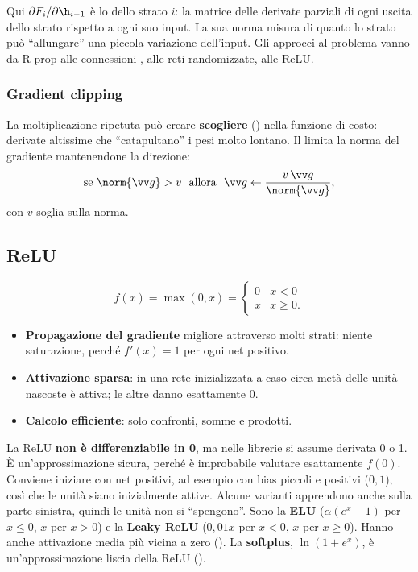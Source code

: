 Qui $\partial F_i/\partial\h_{i-1}$ è lo  dello strato $i$: la matrice delle derivate parziali di
ogni uscita dello strato rispetto a ogni suo input. La sua norma misura di quanto lo strato può ``allungare'' una
piccola variazione dell'input. Gli approcci al problema vanno da R-prop alle connessioni , alle reti
randomizzate, alle ReLU.

\subsubsection{Gradient clipping}
La moltiplicazione ripetuta può creare \textbf{scogliere} () nella funzione di costo: derivate
altissime che ``catapultano'' i pesi molto lontano. Il  limita la norma del gradiente
mantenendone la direzione:
\[
\text{se }\norm{\vv g}>v\ \text{ allora }\ \vv g\leftarrow\frac{v\,\vv g}{\norm{\vv g}},
\]
con $v$ soglia sulla norma.

\subsection{ReLU}
\label{sec:relu}

\begin{definizione}[ReLU]
\[
f(x) = \max(0,x) = \begin{cases}0 & x<0\\ x & x\ge0.\end{cases}
\]
\end{definizione}

\begin{itemize}
  \item \textbf{Propagazione del gradiente} migliore attraverso molti strati: niente saturazione, perché $f'(x)=1$ per
        ogni net positivo.
  \item \textbf{Attivazione sparsa}: in una rete inizializzata a caso circa metà delle unità nascoste è attiva;
        le altre danno esattamente 0.
  \item \textbf{Calcolo efficiente}: solo confronti, somme e prodotti.
\end{itemize}
La ReLU \textbf{non è differenziabile in 0}, ma nelle librerie si assume derivata 0 o 1. È un'approssimazione sicura,
perché è improbabile valutare esattamente $f(0)$. Conviene iniziare con net positivi, ad esempio con bias piccoli e
positivi ($0{,}1$), così che le unità siano inizialmente attive. Alcune varianti apprendono anche sulla parte
sinistra, quindi le unità non si ``spengono''. Sono la \textbf{ELU} ($\alpha(e^x-1)$ per $x\le0$, $x$ per $x>0$) e
la \textbf{Leaky ReLU} ($0{,}01x$ per $x<0$, $x$ per $x\ge0$). Hanno anche attivazione media più vicina a zero
(). La \textbf{softplus}, $\ln(1+e^x)$, è un'approssimazione liscia della ReLU
().


